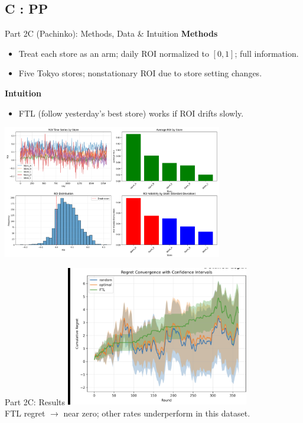 \documentclass{beamer}
\begin{document}
\subsection{C : PP}

\begin{frame}{Part 2C (Pachinko): Methods, Data \& Intuition}
\textbf{Methods}
\begin{itemize}
  \item Treat each store as an arm; daily ROI normalized to $[0,1]$; full information.
  \item Five Tokyo stores; nonstationary ROI due to store setting changes.
\end{itemize}
\textbf{Intuition}
\begin{itemize}
  \item FTL (follow yesterday’s best store) works if ROI drifts slowly.
\end{itemize}
\centering
\includegraphics[width=0.72\textwidth]{332Project2/figures/ROI.png}
\end{frame}

\begin{frame}{Part 2C: Results}
\centering
\includegraphics[width=0.6\textwidth]{332Project2/figures/Regret.png}\\
\small FTL regret $\to$ near zero; other rates underperform in this dataset.
\end{frame}
\end{document}
